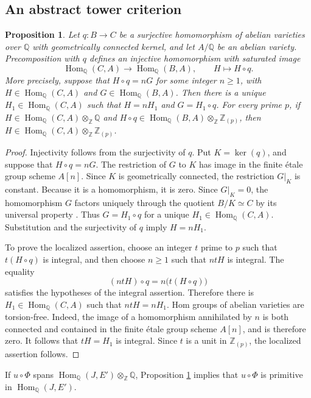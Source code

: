 \documentclass[12pt, letterpaper]{amsart}
\newtheorem{proposition}[theorem]{Proposition}
\theoremstyle{definition}
\theoremstyle{remark}
\newcommand{\Q}{\mathbb Q}
\newcommand{\Z}{\mathbb Z}
\newcommand{\Hom}{\operatorname{Hom}}
\numberwithin{equation}{section}
\begin{document}
\subsection{An abstract tower criterion}

\begin{proposition}
\label{prop:connected-quotient-saturation}
Let \(q:B\to C\) be a surjective homomorphism of abelian varieties over \(\Q\)
with geometrically connected kernel, and let \(A/\Q\) be an abelian variety.
Precomposition with \(q\) defines an injective homomorphism with saturated image
\[
        \Hom_\Q(C,A)\longrightarrow\Hom_\Q(B,A),
        \qquad H\longmapsto H\circ q.
\]
More precisely, suppose that \(H\circ q=nG\) for some integer \(n\geq1\), with
\(H\in\Hom_\Q(C,A)\) and \(G\in\Hom_\Q(B,A)\). Then there is a unique
\(H_1\in\Hom_\Q(C,A)\) such that \(H=nH_1\) and \(G=H_1\circ q\).
For every prime \(p\), if
\(H\in\Hom_\Q(C,A)\otimes_\Z\Q\) and
\(H\circ q\in\Hom_\Q(B,A)\otimes_\Z\Z_{(p)}\), then
\(H\in\Hom_\Q(C,A)\otimes_\Z\Z_{(p)}\).
\end{proposition}

\begin{proof}
Injectivity follows from the surjectivity of \(q\). Put \(K=\ker(q)\), and
suppose that \(H\circ q=nG\). The restriction of \(G\) to \(K\) has image in
the finite \'etale group scheme \(A[n]\). Since \(K\) is geometrically
connected,
the restriction \(G|_K\) is constant. Because it is a homomorphism, it is zero.
Since \(G|_K=0\), the homomorphism \(G\) factors uniquely through the
quotient \(B/K\simeq C\) by its universal property
\cite{Poonen}. Thus \(G=H_1\circ q\) for a unique
\(H_1\in\Hom_\Q(C,A)\). Substitution and the
surjectivity of \(q\) imply \(H=nH_1\).

To prove the localized assertion, choose an integer \(t\)
prime to \(p\) such that \(t(H\circ q)\) is integral, and then choose
\(n\geq1\) such that \(ntH\) is integral. The equality
\[
        (ntH)\circ q=n\bigl(t(H\circ q)\bigr)
\]
satisfies the hypotheses of the integral assertion. Therefore there is
\(H_1\in\Hom_\Q(C,A)\) such that \(ntH=nH_1\). Hom groups of abelian varieties
are torsion-free. Indeed, the image of a homomorphism annihilated by \(n\) is
both connected and contained in the finite \'etale group scheme \(A[n]\), and
is therefore zero. It follows that \(tH=H_1\) is integral. Since \(t\) is a
unit in \(\Z_{(p)}\), the localized assertion follows.
\end{proof}

If \(u\circ\Phi\) spans
\(\Hom_\Q(J,E')\otimes_\Z\Q\), Proposition
\ref{prop:connected-quotient-saturation} implies that \(u\circ\Phi\) is
primitive in \(\Hom_\Q(J,E')\).
\end{document}
